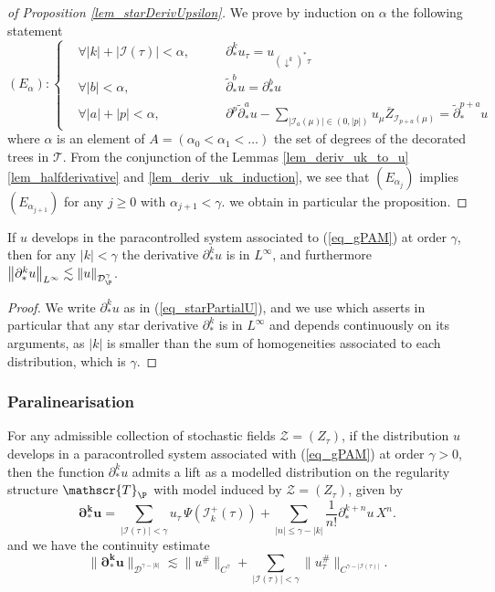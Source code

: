 \documentclass[11pt]{preprint}
\newcommand{\mcI}{\mathcal{I}}
\newcommand{\mcD}{\mathcal{D}}
\newcommand{\mcZ}{\mathcal{Z}}
\newcommand{\mcT}{\mathcal{T}}
\def\eqref#1{(\ref{#1})}
\newcommand{\scrT}{\mathscr{T}}
\newcommand{\norme}[1]{\left\lVert #1 \right\lVert}
\begin{document}
	\begin{proof}[of Proposition \ref{lem_starDerivUpsilon}]
	We prove by induction on $\alpha$ the following statement 
	$$
	(E_\alpha) : \left\{ \begin{array}{lll}
	&\forall |k|+|\mcI(\tau)|<\alpha , \qquad  &\partial^k_* u_\tau = u_{(\downarrow^k)^*\tau}
	\\
	&\forall |b|<\alpha, \qquad &\widetilde{\partial}^b_*u = \partial^b_*u
	\\
&\forall |a|+|p|< \alpha, \qquad 	&\partial^p\widetilde\partial^a_* u - \sum_{|\mcI_a(\mu)|\in(0,|p|)} u_\mu \overline{Z}_{\mcI_{p+a}(\mu)} = \widetilde\partial^{p+a}_* u 	
\end{array}\right.
	$$
where $\alpha$ is an element of  $A = (\alpha_0<\alpha_1<\dots)$ the set of degrees of the decorated trees in $\mcT$.
From the conjunction of the Lemmas \ref{lem_deriv_uk_to_u} \ref{lem_halfderivative} and \ref{lem_deriv_uk_induction}, we see that $(E_{\alpha_j})$ implies  $(E_{\alpha_{j+1}})$ for any $j\geq 0$ with $\alpha_{j+1}<\gamma$. we obtain in particular the proposition.
	\end{proof}
	
	
	
	
	\begin{corollary}\label{cor_welldefinition_starpartialu}
		If $u$ develops in the paracontrolled system associated to \eqref{eq_gPAM} at order $\gamma$, then for any $|k|<\gamma$ the derivative $\partial^k_*u$ is in $L^\infty$, and furthermore $\norme{\partial^k_* u}_{L^\infty}\lesssim \norme{u}_{\mcD^\gamma_\P}$. 
	\end{corollary}
	
	\begin{proof}
		We write $\partial^k_*u$ as in  \eqref{eq_starPartialU}, and we use  \cite[Theorem 1]{LocalExpansionsParacSystems} which asserts in particular that any star derivative $\partial^k_*$ is in $L^\infty$ and depends continuously on its arguments, as $|k|$ is smaller than the sum of homogeneities associated to each distribution, which is $\gamma$. 
	\end{proof}
	
	
	\subsubsection{Paralinearisation}
	
	\begin{lemma}  \label{lem_LiftGpamsystemToRS}
		For any admissible collection of stochastic fields $\mcZ=(Z_\tau)$, if the distribution $u$ develops in a paracontrolled system associated with \eqref{eq_gPAM} at order $\gamma > 0$, then the function $\partial_*^{k}u$ admits a lift as a modelled distribution on the regularity structure $\scrT_\P$ with model induced by $\mcZ=(Z_\tau)$, given by
		$$
		\bm{\partial_{*}^{k} u} = \sum_{|\mcI(\tau)|<\gamma } u_\tau \, \Psi(\mcI_{k}^+ (\tau))  + \sum_{ |n|\leq \gamma - |k|} \frac{1}{n!}\partial_*^{k + n}u \, X^{n}.
		$$
		and we have the continuity estimate $$\lVert\bm{\partial_{*}^{k} u}\lVert_{\mcD^{\gamma-|k|}} \lesssim \lVert {u^\#} \lVert_{C^\gamma}  +  \sum_{|\mcI(\tau)|<\gamma}\lVert u_\tau^\#\lVert_{C^{\gamma-|\mcI(\tau)|}}.$$
	\end{lemma}
	
\end{document}
